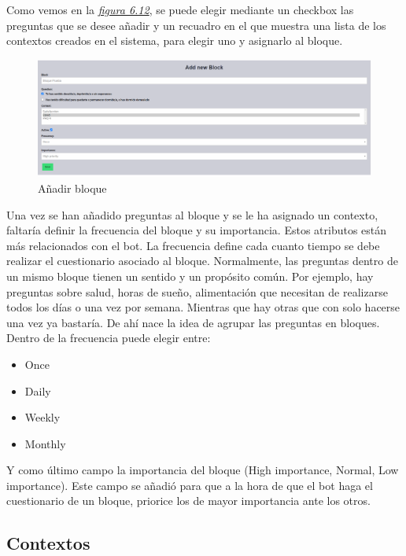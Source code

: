 Como vemos en la \textit{\hyperref[fig:add-bloque]{figura 6.12}}, se puede elegir mediante un checkbox las preguntas que se desee añadir y un recuadro en el que  muestra una lista de los contextos creados en el sistema, para elegir uno y asignarlo al bloque. \vspace{0.7cm}


\begin{figure}[!ht]
    \centering
    \includegraphics[width=1\textwidth]{imagenes/add_block.png}
    \caption{Añadir bloque}
    \label{fig:add-bloque}
\end{figure}\vspace{0.7cm}

Una vez se han añadido preguntas al bloque y se le ha asignado un contexto, faltaría definir la frecuencia del bloque y su importancia. Estos atributos están más relacionados con el bot. La frecuencia define cada cuanto tiempo se debe realizar el cuestionario asociado al bloque. Normalmente, las preguntas dentro de un mismo bloque tienen un sentido y un propósito común. Por ejemplo, hay preguntas sobre salud, horas de sueño, alimentación que necesitan de realizarse todos los días o una vez por semana. Mientras que hay otras que con solo hacerse una vez ya bastaría. De ahí nace la idea de agrupar las preguntas en bloques. Dentro de la frecuencia puede elegir entre:

\begin{itemize}
    \item Once
    \item Daily
    \item Weekly
    \item Monthly
\end{itemize}

Y como último campo la importancia del bloque (High importance, Normal, Low importance). Este campo  se añadió para que a la hora de que el bot haga el cuestionario de un bloque, priorice los de mayor importancia ante los otros.

\subsection{Contextos}

